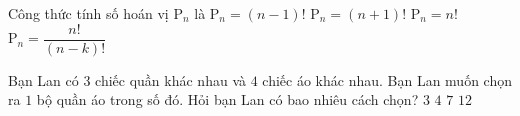 \begin{ex}%
	Công thức tính số hoán vị $\mathrm{P}_n$ là
	\choice
	{$\mathrm{P}_n=(n-1)!$}
	{$\mathrm{P}_n=(n+1)!$}
	{\True $\mathrm{P}_n=n!$}
	{$\mathrm{P}_n=\dfrac{n!}{(n-k)!}$}
\end{ex}
\begin{ex}%
	Bạn Lan có $3$ chiếc quần khác nhau và $4$ chiếc áo khác nhau. Bạn Lan muốn chọn ra $1$ bộ quần áo trong số đó. Hỏi bạn Lan có bao nhiêu cách chọn?
	\choice
	{$3$}
	{$4$}
	{$7$}
	{\True $12$}
\end{ex}

